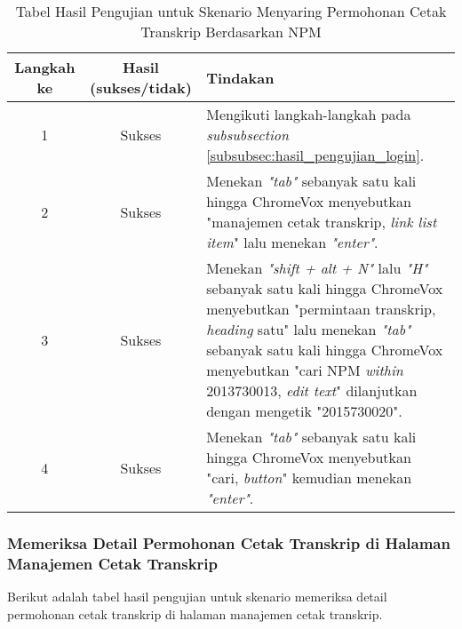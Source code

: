 \begin{table}[H]
    \centering 
    \caption{Tabel Hasil Pengujian untuk Skenario Menyaring Permohonan Cetak Transkrip Berdasarkan NPM}
    \label{tab:hasil_pengujian_menyaring_permohonan_cetak_transkrip_berdasarkan_npm}
    \begin{tabular}{|c|c|p{10cm}|}
        \toprule
        Langkah ke & Hasil (sukses/tidak) & Tindakan \\

        \midrule
        1 & Sukses & Mengikuti langkah-langkah pada \textit{subsubsection} \ref{subsubsec:hasil_pengujian_login}. \\
        2 & Sukses & Menekan \textit{"tab"} sebanyak satu kali hingga ChromeVox menyebutkan "manajemen cetak transkrip, \textit{link list item}" lalu menekan \textit{"enter"}. \\
        3 & Sukses & Menekan \textit{"shift + alt + N"} lalu \textit{"H"} sebanyak satu kali hingga ChromeVox menyebutkan "permintaan transkrip, \textit{heading} satu" lalu menekan \textit{"tab"} sebanyak satu kali hingga ChromeVox menyebutkan "cari NPM \textit{within} 2013730013, \textit{edit text}" dilanjutkan dengan mengetik "2015730020". \\
        4 & Sukses & Menekan \textit{"tab"} sebanyak satu kali hingga ChromeVox menyebutkan "cari, \textit{button}" kemudian menekan \textit{"enter"}. \\

        \bottomrule

    \end{tabular}
\end{table}

\subsubsection{Memeriksa Detail Permohonan Cetak Transkrip di Halaman Manajemen Cetak Transkrip}
\label{subsubsec:hasil_pengujian_memeriksa_detail_permohonan_cetak_transkrip_di_halaman_manajemen_cetak_transkrip}
Berikut adalah tabel hasil pengujian untuk skenario memeriksa detail permohonan cetak transkrip di halaman manajemen cetak transkrip.


